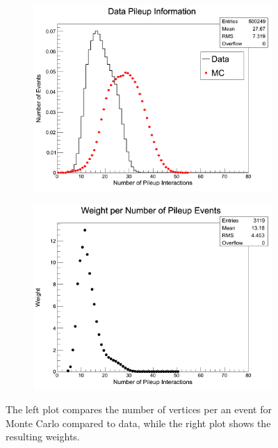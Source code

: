 \begin{figure}[!htbp]
    \centering
    \begin{subfigure}[b]{\SideBySidePlotWidth} 
        \includegraphics[width=\textwidth]{figures/Simulation/h_DataMCBCComparsionBornPt25to250.png}
        \caption{}
    \end{subfigure}%
    \begin{subfigure}[b]{\SideBySidePlotWidth} 
        \includegraphics[width=\textwidth]{figures/Simulation/h_MCWeightsperPileUpBornPt25to250.png}
        \caption{}
    \end{subfigure}%
    \caption{The left plot compares the number of vertices per an event for Monte Carlo compared to data, while the right plot shows the resulting weights.}
    \label{fig:PileupToData}
\end{figure}

